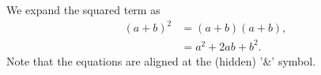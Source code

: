 We expand the squared term as
\begin{align}
  (a + b)^2 &= (a + b) (a + b), \\
     &= a^2 + 2ab + b^2.
\end{align}
Note that the equations are aligned at the (hidden) '\&' symbol.
